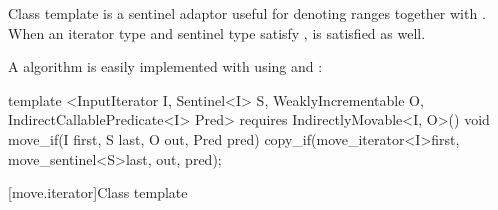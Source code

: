 \exitexample

\begin{addedblock}
{\color{newclr}
\pnum
Class template  is a sentinel adaptor useful for denoting
ranges together with . When an iterator type  and
sentinel type  satisfy ,
 is satisfied as well.

\pnum
\enterexample A  algorithm is easily implemented with
 using  and :

\begin{codeblock}
template <InputIterator I, Sentinel<I> S, WeaklyIncrementable O,
          IndirectCallablePredicate<I> Pred>
  requires IndirectlyMovable<I, O>()
void move_if(I first, S last, O out, Pred pred)
{
  copy_if(move_iterator<I>{first}, move_sentinel<S>{last}, out, pred);
}
\end{codeblock}

\exitexample
} %
\end{addedblock}

[move.iterator]{Class template }

